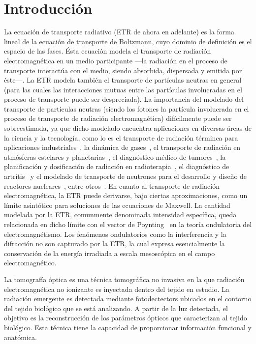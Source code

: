 \chapter{Introducción}
\lhead{\thepage}
\vspace{0.01\textheight}


La ecuación de transporte radiativo (ETR de ahora en adelante) es la forma lineal de la ecuación de transporte de Boltzmann, 
cuyo dominio de definición es el espacio de las fases. Ésta ecuación modela el transporte 
de radiación electromagnética en un medio participante ---la radiación en el proceso de transporte 
interactúa con el medio, siendo absorbida, dispersada y emitida por éste---. La ETR modela también el transporte de partículas neutras en
 general (para las cuales las interacciones mutuas entre las partículas involucradas 
 en el proceso de transporte puede ser despreciada). La importancia del modelado del transporte de 
 partículas neutras (siendo los fotones la partícula involucrada en el proceso de transporte de 
 radiación electromagnética) difícilmente puede ser sobreestimada, ya que dicho modelado encuentra aplicaciones en diversas
 áreas de la ciencia y la tecnología, como lo es el transporte de radiación 
 términca para aplicaciones industriales~\cite{Howell2010, Thynell1998}, la dinámica de 
 gases~\cite{Duderstadt1979}, el transporte de radiación en atmósferas estelares y 
 planetarias~\cite{Qin2015, Dymond1997, Chandrasekhar1960}, el diagnóstico médico de 
 tumores~\cite{Zhu2005, Zhu2010, Fujii2016b}, la planificación y dosificación 
 de radiación en radioterapia~\cite{Vassiliev2010,Bedford2019}, el diagnóstico de artrítis~\cite{Klose2002, Netz2001} 
 y el modelado de transporte de neutrones para el desarrollo 
 y diseño de reactores nucleares~\cite{Larsen2006, Sanchez1982, Anli2006}, entre otros~\cite {Mishchenko1999, Prasher2003}. 
 En cuanto al transporte de radiación electromagnética, la ETR puede derivarse, bajo ciertas aproximaciones, como un límite asintótico 
 para soluciones de las ecuaciones de Maxwell. La cantidad modelada por la ETR, comunmente denominada 
 intensidad específica, queda relacionada en dicho límite con el vector de Poynting~\cite{Mishchenko2002, Ripoll2011} 
 en la teoría ondulatoria del electromagnétismo. Los fenómenos ondulatorios como la interferencia y la difracción no son
 capturado por la ETR, la cual expresa esencialmente la conservación de la
 energía irradiada a escala mesoscópica en el campo electromagnético.

 La tomografía óptica es una técnica tomográfica no invasiva en la que
 radiación electromagnética no ionizante es inyectada dentro del tejido en estudio.
 La radiación emergente es detectada mediante fotodectectors 
 ubicados en el contorno del tejido biológico que se está analizando. A
  partir de la luz detectada, el objetivo es la reconstrucción de
 los parámetros ópticos que caracterizan al tejido biológico. Esta técnica 
 tiene la capacidad de proporcionar información funcional y anatómica. 
 
